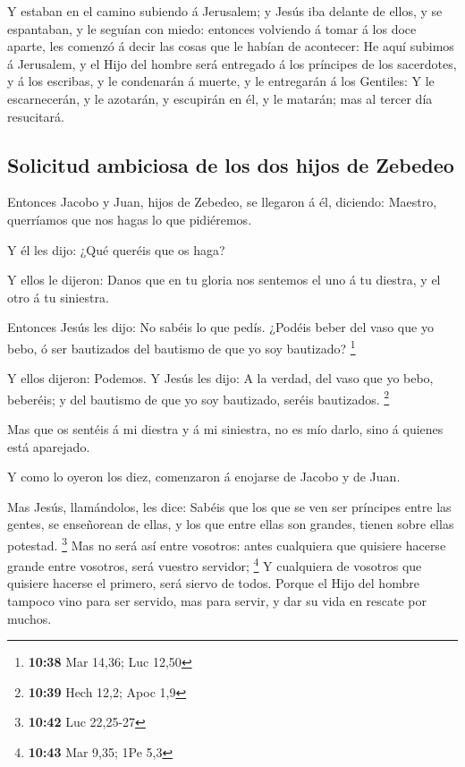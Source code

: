  Y estaban en el camino subiendo á Jerusalem; y Jesús iba
delante de ellos, y se espantaban, y le seguían con miedo: entonces
volviendo á tomar á los doce aparte, les comenzó á decir las cosas que
le habían de acontecer:  He aquí subimos á Jerusalem, y el
Hijo del hombre será entregado á los príncipes de los sacerdotes, y á
los escribas, y le condenarán á muerte, y le entregarán á los Gentiles:
 Y le escarnecerán, y le azotarán, y escupirán en él, y le
matarán; mas al tercer día resucitará.

\hypertarget{solicitud-ambiciosa-de-los-dos-hijos-de-zebedeo}{%
\subsection{Solicitud ambiciosa de los dos hijos de
Zebedeo}\label{solicitud-ambiciosa-de-los-dos-hijos-de-zebedeo}}

 Entonces Jacobo y Juan, hijos de Zebedeo, se llegaron á
él, diciendo: Maestro, querríamos que nos hagas lo que pidiéremos.

 Y él les dijo: ¿Qué queréis que os haga?

 Y ellos le dijeron: Danos que en tu gloria nos sentemos el
uno á tu diestra, y el otro á tu siniestra.

 Entonces Jesús les dijo: No sabéis lo que pedís. ¿Podéis
beber del vaso que yo bebo, ó ser bautizados del bautismo de que yo soy
bautizado? \footnote{\textbf{10:38} Mar 14,36; Luc 12,50}

 Y ellos dijeron: Podemos. Y Jesús les dijo: A la verdad,
del vaso que yo bebo, beberéis; y del bautismo de que yo soy bautizado,
seréis bautizados. \footnote{\textbf{10:39} Hech 12,2; Apoc 1,9}

 Mas que os sentéis á mi diestra y á mi siniestra, no es
mío darlo, sino á quienes está aparejado.

 Y como lo oyeron los diez, comenzaron á enojarse de Jacobo
y de Juan.

 Mas Jesús, llamándolos, les dice: Sabéis que los que se
ven ser príncipes entre las gentes, se enseñorean de ellas, y los que
entre ellas son grandes, tienen sobre ellas potestad. \footnote{\textbf{10:42}
  Luc 22,25-27}  Mas no será así entre vosotros: antes
cualquiera que quisiere hacerse grande entre vosotros, será vuestro
servidor; \footnote{\textbf{10:43} Mar 9,35; 1Pe 5,3}  Y
cualquiera de vosotros que quisiere hacerse el primero, será siervo de
todos.  Porque el Hijo del hombre tampoco vino para ser
servido, mas para servir, y dar su vida en rescate por muchos.

